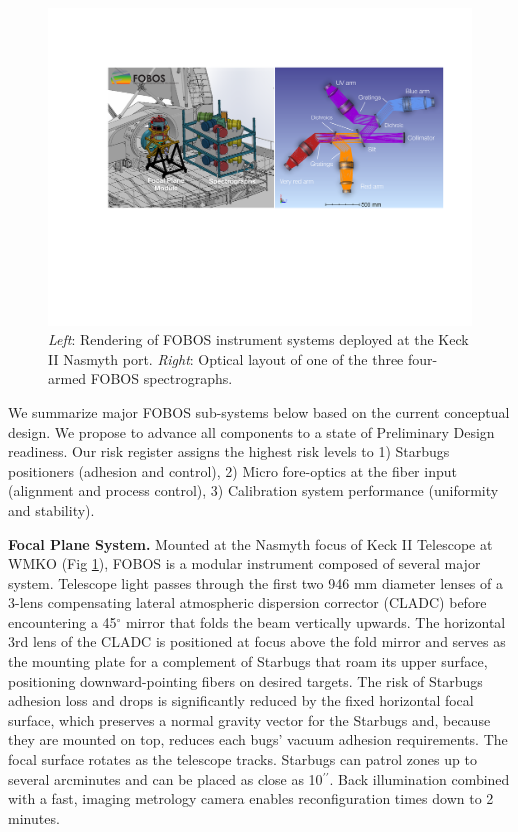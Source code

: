 \documentclass[oneside,11pt]{amsart}
\newcommand{\arcsec}{\mbox{$^{\prime\prime}$}}
\begin{document}
\begin{figure}[h!]
%
\vskip -0.1in
%
\includegraphics[width=\textwidth]{figs/FOBOS_inst_2019-10-28.pdf}
%
\caption{\small {\it Left}: Rendering of FOBOS instrument systems
deployed at the Keck II Nasmyth port.  {\it Right}: Optical layout of one of
the three four-armed FOBOS spectrographs.}
%
\label{fig:layout}
%
\end{figure}

We summarize major FOBOS sub-systems below based on the current conceptual design.  We propose to advance all components to a state of Preliminary Design readiness.  Our risk register assigns the highest risk levels to 1) Starbugs positioners (adhesion and control), 2) Micro fore-optics at the fiber input (alignment and process control), 3) Calibration system performance (uniformity and stability).

\noindent \textbf{Focal Plane System.} Mounted at the Nasmyth focus of Keck II Telescope at WMKO (Fig \ref{fig:layout}), FOBOS is a modular instrument
composed of several major system.  Telescope light passes through the first two 946 mm diameter lenses of a 3-lens
compensating lateral atmospheric dispersion corrector (CLADC) before encountering a 45$^\circ$ mirror that folds the
beam vertically upwards.  The horizontal 3rd lens of the CLADC is positioned at focus above the fold mirror and serves
as the mounting plate for a complement of Starbugs that roam its upper surface, positioning downward-pointing fibers on
desired targets.  The risk of Starbugs adhesion loss and drops is significantly reduced by the fixed horizontal focal
surface, which preserves a normal gravity vector for the Starbugs and, because they are mounted on top, reduces each
bugs' vacuum adhesion requirements.  The focal surface rotates as the telescope tracks.  Starbugs can patrol zones up to several arcminutes and can be placed as close as 10\arcsec{}.  Back illumination combined with a fast, imaging metrology camera enables reconfiguration times down to 2 minutes. 
\end{document}
